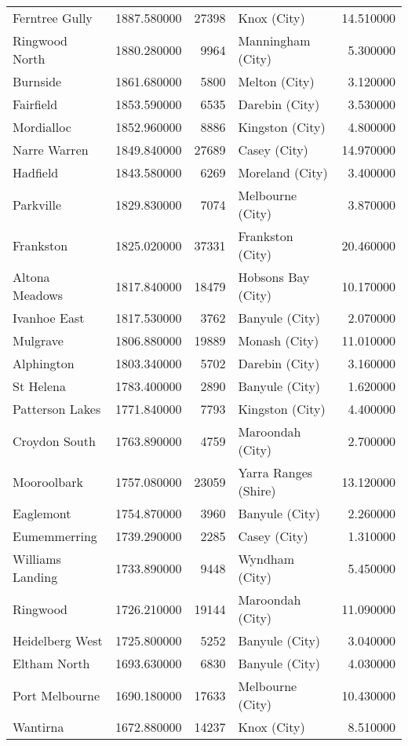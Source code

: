 \begin{longtable}{lrrlr}
Ferntree Gully & 1887.580000 & 27398 & Knox (City) & 14.510000 \\
Ringwood North & 1880.280000 & 9964 & Manningham (City) & 5.300000 \\
Burnside & 1861.680000 & 5800 & Melton (City) & 3.120000 \\
Fairfield & 1853.590000 & 6535 & Darebin (City) & 3.530000 \\
Mordialloc & 1852.960000 & 8886 & Kingston (City) & 4.800000 \\
Narre Warren & 1849.840000 & 27689 & Casey (City) & 14.970000 \\
Hadfield & 1843.580000 & 6269 & Moreland (City) & 3.400000 \\
Parkville & 1829.830000 & 7074 & Melbourne (City) & 3.870000 \\
Frankston & 1825.020000 & 37331 & Frankston (City) & 20.460000 \\
Altona Meadows & 1817.840000 & 18479 & Hobsons Bay (City) & 10.170000 \\
Ivanhoe East & 1817.530000 & 3762 & Banyule (City) & 2.070000 \\
Mulgrave & 1806.880000 & 19889 & Monash (City) & 11.010000 \\
Alphington & 1803.340000 & 5702 & Darebin (City) & 3.160000 \\
St Helena & 1783.400000 & 2890 & Banyule (City) & 1.620000 \\
Patterson Lakes & 1771.840000 & 7793 & Kingston (City) & 4.400000 \\
Croydon South & 1763.890000 & 4759 & Maroondah (City) & 2.700000 \\
Mooroolbark & 1757.080000 & 23059 & Yarra Ranges (Shire) & 13.120000 \\
Eaglemont & 1754.870000 & 3960 & Banyule (City) & 2.260000 \\
Eumemmerring & 1739.290000 & 2285 & Casey (City) & 1.310000 \\
Williams Landing & 1733.890000 & 9448 & Wyndham (City) & 5.450000 \\
Ringwood & 1726.210000 & 19144 & Maroondah (City) & 11.090000 \\
Heidelberg West & 1725.800000 & 5252 & Banyule (City) & 3.040000 \\
Eltham North & 1693.630000 & 6830 & Banyule (City) & 4.030000 \\
Port Melbourne & 1690.180000 & 17633 & Melbourne (City) & 10.430000 \\
Wantirna & 1672.880000 & 14237 & Knox (City) & 8.510000 \\

\end{longtable}
